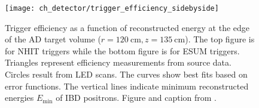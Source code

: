 \begin{figure}
    \centering
    \texttt{[image: ch\_detector/trigger\_efficiency\_sidebyside]}
    \caption{
        Trigger efficiency as a function of reconstructed energy
        at the edge of the AD target volume ($r=\SI{120}{\cm},z=\SI{135}{\cm}$).
        The top figure is for NHIT triggers while the bottom figure is for ESUM triggers.
        Triangles represent efficiency measurements from  source data.
        Circles result from LED scans.
        The curves show best fits based on error functions.
        The vertical lines indicate minimum reconstructed energies $E_{\text{min}}$
        of IBD positrons.
        Figure and caption from \cite{sidebyside}.
    }
    \label{fig:trig_eff}
\end{figure}

